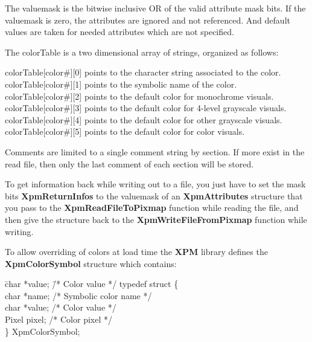 The valuemask is the bitwise inclusive OR of the valid attribute mask bits. If
the valuemask is zero, the attributes are ignored and not referenced. And
default values are taken for needed attributes which are not specified.

The colorTable is a two dimensional array of strings, organized as follows:
\begin{flushleft}
\hspace{.5cm}colorTable[color\#][0] points to the character string associated
to the color.\\
\hspace{.5cm}colorTable[color\#][1] points to the symbolic name of the color.\\
\hspace{.5cm}colorTable[color\#][2] points to the default color for monochrome
visuals.\\
\hspace{.5cm}colorTable[color\#][3] points to the default color for 4-level
grayscale visuals.\\
\hspace{.5cm}colorTable[color\#][4] points to the default color for other
grayscale visuals.\\
\hspace{.5cm}colorTable[color\#][5] points to the default color for color
visuals. 
\end{flushleft}

Comments are limited to a single comment string by section. If more exist in
the read file, then only the last comment of each section will be stored.

To get information back while writing out to a file, you just have to set
the mask bits {\bf XpmReturnInfos} to the valuemask of an {\bf XpmAttributes}
structure that you pass to the {\bf XpmReadFileToPixmap} function while reading
the file, and then give the structure back to the {\bf XpmWriteFileFromPixmap}
function while writing.

\vspace{.5cm}
To allow overriding of colors at load time the {\bf XPM} library defines the
{\bf XpmColorSymbol} structure which contains:

\begin{tabbing}
\hspace{1cm}\= char *value; \hspace{1.5cm}\= /* Color value */\kill
typedef struct \{\\
\> char *name; \> /* Symbolic color name */\\
\> char *value;\> /* Color value */\\
\> Pixel pixel;\> /* Color pixel */\\
\} XpmColorSymbol;
\end{tabbing}

